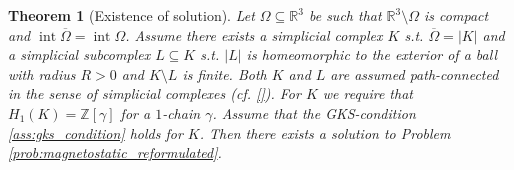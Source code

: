 \documentclass[12pt,a4paper]{article}
\numberwithin{equation}{subsection}
\numberwithin{lemma}{subsection}
\newtheorem{theorem}[lemma]{Theorem}
\theoremstyle{definition}
\DeclareMathOperator{\interior}{int}
\newcommand{\integers}{\mathbb{Z}}
\newcommand{\omegabar}{\overline{\Omega}}
\newcommand{\real}{\mathbb{R}}
\begin{document}
\begin{theorem}[Existence of solution]\label{thm:existence}
    Let $\Omega \subseteq \real^3$ be such that $\real^3 \setminus \Omega$
    is compact and $\interior \omegabar = \interior \Omega$. Assume there 
    exists a simplicial complex $K$ s.t. $\omegabar = |K|$ and a simplicial
    subcomplex $L \subseteq K$ s.t. $|L|$ is homeomorphic to the exterior 
    of a ball with radius $R > 0$ and $K \setminus L$ is finite. Both 
    $K$ and $L$ are assumed path-connected in the sense of simplicial complexes
    (cf. \ref{}). 
    For $K$ we require that $H_1(K) = \integers [\gamma]$ for a $1$-chain 
    $\gamma$.
    Assume that 
    the GKS-condition \ref{ass:gks_condition} holds for $K$. 
    Then there exists a solution 
    to Problem \ref{prob:magnetostatic_reformulated}.
\end{theorem}
\end{document}

